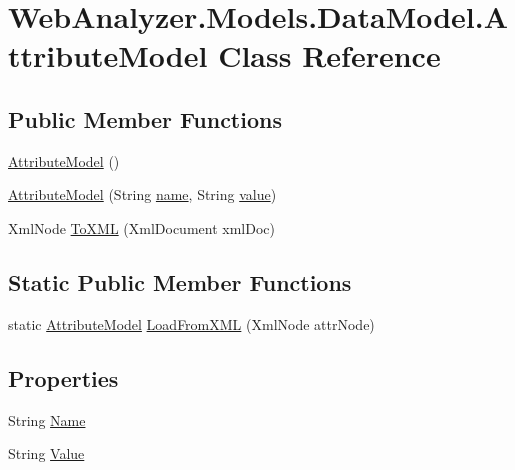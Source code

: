 \hypertarget{class_web_analyzer_1_1_models_1_1_data_model_1_1_attribute_model}{}\section{Web\+Analyzer.\+Models.\+Data\+Model.\+Attribute\+Model Class Reference}
\label{class_web_analyzer_1_1_models_1_1_data_model_1_1_attribute_model}
\subsection*{Public Member Functions}
\begin{DoxyCompactItemize}
\item 
\hyperlink{class_web_analyzer_1_1_models_1_1_data_model_1_1_attribute_model_a7b736b820a7e06de49cf2d937a898579}{Attribute\+Model} ()
\item 
\hyperlink{class_web_analyzer_1_1_models_1_1_data_model_1_1_attribute_model_a9521c8ec3b53c8e617249323ecd2f291}{Attribute\+Model} (String \hyperlink{_u_i_2_h_t_m_l_resources_2js_2src_2create__experiment_8js_adac2bcb4f01b574cbc63fe8ee2c56bf0}{name}, String \hyperlink{_u_i_2_h_t_m_l_resources_2js_2lib_2underscore_8min_8js_af7e1471ab89699458c4df8bb657298f6}{value})
\item 
Xml\+Node \hyperlink{class_web_analyzer_1_1_models_1_1_data_model_1_1_attribute_model_af9a4c1d421bd73f4c25edd4f6df7ad42}{To\+X\+M\+L} (Xml\+Document xml\+Doc)
\end{DoxyCompactItemize}
\subsection*{Static Public Member Functions}
\begin{DoxyCompactItemize}
\item 
static \hyperlink{class_web_analyzer_1_1_models_1_1_data_model_1_1_attribute_model}{Attribute\+Model} \hyperlink{class_web_analyzer_1_1_models_1_1_data_model_1_1_attribute_model_a84e8555e8b89040f69ba84836aadeade}{Load\+From\+X\+M\+L} (Xml\+Node attr\+Node)
\end{DoxyCompactItemize}
\subsection*{Properties}
\begin{DoxyCompactItemize}
\item 
String \hyperlink{class_web_analyzer_1_1_models_1_1_data_model_1_1_attribute_model_aed6ff726ffc8f9848b312f1dcb03594b}{Name}
\item 
String \hyperlink{class_web_analyzer_1_1_models_1_1_data_model_1_1_attribute_model_a132abb603aaf2d5bd36c3c3477b1c21d}{Value}
\end{DoxyCompactItemize}
